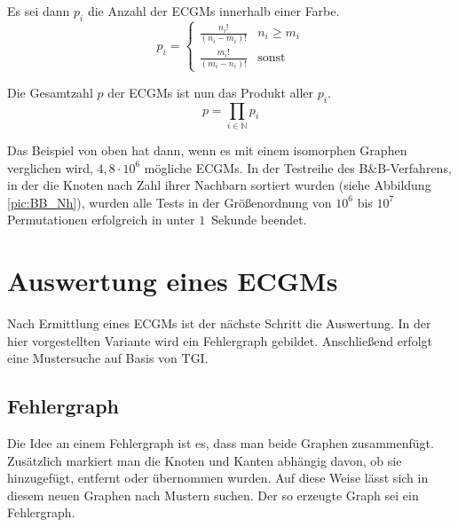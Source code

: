 Es sei dann $p_i$ die Anzahl der ECGMs innerhalb einer Farbe.
\[ p_i=\left\{\begin{array}{ll}
                \frac{n_i!}{(n_i-m_i)!} & n_i \geq m_i \\
                \frac{m_i!}{(m_i-n_i)!} & \text{sonst}
              \end{array}\right. \]
              
Die Gesamtzahl $p$ der ECGMs ist nun das Produkt aller $p_i$.
\[ p=\prod_{i \in \mathbb{N}}p_i \]

Das Beispiel von oben hat dann, wenn es mit einem isomorphen Graphen verglichen wird, 
$4{,}8 \cdot 10^6$ mögliche ECGMs. In der Testreihe des B\&B-Verfahrens, in der die Knoten 
nach Zahl ihrer Nachbarn sortiert wurden (siehe Abbildung \ref{pic:BB_Nh}), wurden alle Tests 
in der Größenordnung von $10^6$ bis $10^7$ Permutationen erfolgreich in unter $1$~Sekunde 
beendet.

\section{Auswertung eines ECGMs}
Nach Ermittlung eines ECGMs ist der nächste Schritt die Auswertung. In der hier vorgestellten 
Variante wird ein Fehlergraph gebildet. Anschließend erfolgt eine Mustersuche auf Basis von
TGI.

\subsection{Fehlergraph}
Die Idee an einem Fehlergraph ist es, dass man beide Graphen zusammenfügt. Zusätzlich 
markiert man die Knoten und Kanten abhängig davon, ob sie hinzugefügt, entfernt oder übernommen 
wurden. Auf diese Weise lässt sich in diesem neuen Graphen nach Mustern suchen. Der so erzeugte Graph 
sei ein Fehlergraph.

